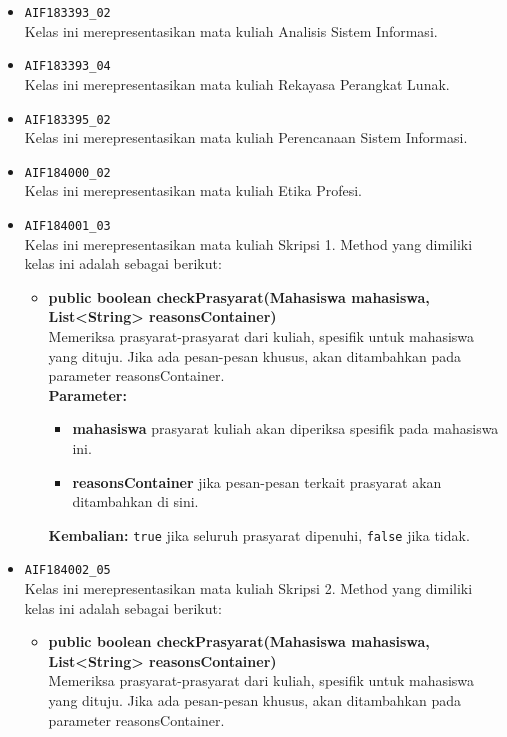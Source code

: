 \begin{enumerate}
\begin{itemize}
		\item \texttt{AIF183393\_02} \\
		Kelas ini merepresentasikan mata kuliah Analisis Sistem Informasi.
		\item \texttt{AIF183393\_04} \\
		Kelas ini merepresentasikan mata kuliah Rekayasa Perangkat Lunak.
		\item \texttt{AIF183395\_02} \\
		Kelas ini merepresentasikan mata kuliah Perencanaan Sistem Informasi.
		\item \texttt{AIF184000\_02} \\
		Kelas ini merepresentasikan mata kuliah Etika Profesi.
		\item \texttt{AIF184001\_03} \\
		Kelas ini merepresentasikan mata kuliah Skripsi 1. Method yang dimiliki kelas ini adalah sebagai berikut: 
		\begin{itemize}
			\item \textbf{public boolean checkPrasyarat(Mahasiswa mahasiswa, List<String> reasonsContainer)}\\
			Memeriksa prasyarat-prasyarat dari kuliah, spesifik untuk mahasiswa yang dituju. Jika ada pesan-pesan khusus, akan ditambahkan pada parameter reasonsContainer.\\
			\textbf{Parameter:}
			\begin{itemize}
				\item \textbf{mahasiswa} prasyarat kuliah akan diperiksa spesifik pada mahasiswa ini.
				\item \textbf{reasonsContainer} jika pesan-pesan terkait prasyarat akan ditambahkan di sini.
			\end{itemize}
			\textbf{Kembalian:} \texttt{true} jika seluruh prasyarat dipenuhi, \texttt{false} jika tidak.
		\end{itemize}
		\item \texttt{AIF184002\_05} \\
		Kelas ini merepresentasikan mata kuliah Skripsi 2. Method yang dimiliki kelas ini adalah sebagai berikut: 
		\begin{itemize}
			\item \textbf{public boolean checkPrasyarat(Mahasiswa mahasiswa, List<String> reasonsContainer)}\\
			Memeriksa prasyarat-prasyarat dari kuliah, spesifik untuk mahasiswa yang dituju. Jika ada pesan-pesan khusus, akan ditambahkan pada parameter reasonsContainer.\\

\end{itemize}
\end{itemize}
\end{enumerate}
